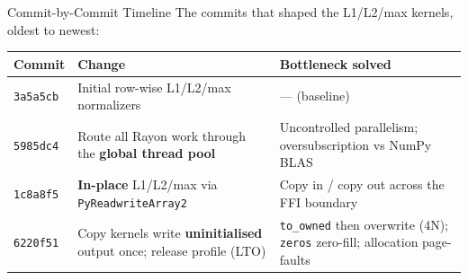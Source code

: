 \documentclass[aspectratio=169]{beamer}
\begin{document}
\begin{frame}{Commit-by-Commit Timeline}
  The commits that shaped the L1/L2/max kernels, oldest to newest:
  \vspace{0.4em}
  \begin{center}\small
  \begin{tabular}{lp{5.4cm}p{4.6cm}}
    \hline
    \textbf{Commit} & \textbf{Change} & \textbf{Bottleneck solved} \\
    \hline
    \texttt{3a5a5cb} & Initial row-wise L1/L2/max normalizers & --- (baseline) \\[3pt]
    \texttt{5985dc4} & Route all Rayon work through the \textbf{global thread pool}
      & Uncontrolled parallelism; oversubscription vs NumPy BLAS \\[3pt]
    \texttt{1c8a8f5} & \textbf{In-place} L1/L2/max via \texttt{PyReadwriteArray2}
      & Copy in / copy out across the FFI boundary \\[3pt]
    \texttt{6220f51} & Copy kernels write \textbf{uninitialised} output once;
      release profile (LTO) & \texttt{to\_owned} then overwrite (4N);
      \texttt{zeros} zero-fill; allocation page-faults \\
    \hline
  \end{tabular}
  \end{center}
\end{frame}
\end{document}
